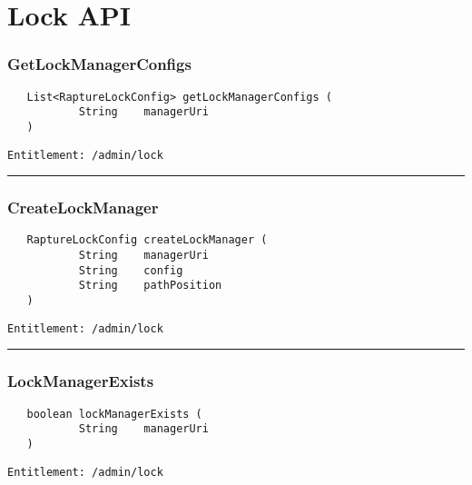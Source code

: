 \chapter{Lock API}

\subsection{GetLockManagerConfigs}
\label{Api:GetLockManagerConfigs}
\begin{Verbatim}
   List<RaptureLockConfig> getLockManagerConfigs (
           String    managerUri
   )
\end{Verbatim}
\begin{Verbatim}[formatcom=\color{Maroon}]
  Entitlement: /admin/lock
\end{Verbatim}



\rule{12cm}{2pt}
\subsection{CreateLockManager}
\label{Api:CreateLockManager}
\begin{Verbatim}
   RaptureLockConfig createLockManager (
           String    managerUri
           String    config
           String    pathPosition
   )
\end{Verbatim}
\begin{Verbatim}[formatcom=\color{Maroon}]
  Entitlement: /admin/lock
\end{Verbatim}



\rule{12cm}{2pt}
\subsection{LockManagerExists}
\label{Api:LockManagerExists}
\begin{Verbatim}
   boolean lockManagerExists (
           String    managerUri
   )
\end{Verbatim}
\begin{Verbatim}[formatcom=\color{Maroon}]
  Entitlement: /admin/lock
\end{Verbatim}



